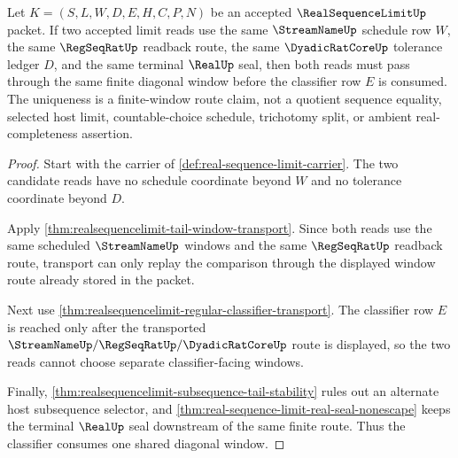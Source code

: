 \begin{theorem}\label{thm:realsequencelimit-diagonal-window-uniqueness}
Let $K=(S,L,W,D,E,H,C,P,N)$ be an accepted $\RealSequenceLimitUp$ packet. If two accepted limit reads use the same $\StreamNameUp$ schedule row $W$, the same $\RegSeqRatUp$ readback route, the same $\DyadicRatCoreUp$ tolerance ledger $D$, and the same terminal $\RealUp$ seal, then both reads must pass through the same finite diagonal window before the classifier row $E$ is consumed. The uniqueness is a finite-window route claim, not a quotient sequence equality, selected host limit, countable-choice schedule, trichotomy split, or ambient real-completeness assertion.
\end{theorem}
\begin{proof}
Start with the carrier of \autoref{def:real-sequence-limit-carrier}. The two candidate reads have no schedule coordinate beyond $W$ and no tolerance coordinate beyond $D$.

Apply \autoref{thm:realsequencelimit-tail-window-transport}. Since both reads use the same scheduled $\StreamNameUp$ windows and the same $\RegSeqRatUp$ readback route, transport can only replay the comparison through the displayed window route already stored in the packet.

Next use \autoref{thm:realsequencelimit-regular-classifier-transport}. The classifier row $E$ is reached only after the transported $\StreamNameUp/\RegSeqRatUp/\DyadicRatCoreUp$ route is displayed, so the two reads cannot choose separate classifier-facing windows.

Finally, \autoref{thm:realsequencelimit-subsequence-tail-stability} rules out an alternate host subsequence selector, and \autoref{thm:real-sequence-limit-real-seal-nonescape} keeps the terminal $\RealUp$ seal downstream of the same finite route. Thus the classifier consumes one shared diagonal window.
\end{proof}

